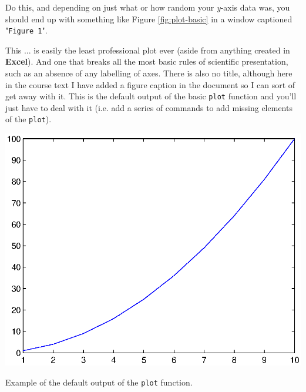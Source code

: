 \documentclass{tufte-book} %
\begin{document}
 Do this, and depending on just what or how random your \textit{y}-axis data was, you should end up with something like Figure \ref{fig:plot-basic} in a window captioned "\texttt{Figure 1}". 

This ... is easily the least professional plot ever (aside from anything created in \textbf{Excel}). And one that breaks all the most basic rules of scientific presentation, such as an absence of any labelling of axes. There is also no title, although here in the course text I have added a figure caption in the document so I can sort of get away with it. This is the default output of the basic \texttt{plot} function and you'll just have to deal with it (i.e. add a series of commands to add missing elements of the \texttt{plot}).

\begin{marginfigure}[0.0in]
\includegraphics[width=\linewidth]{ch1-plot-basic1.eps}
\caption{Example of the default output of the \texttt{plot} function.}
\label{fig:plot-basic}
\end{marginfigure}
\end{document}
